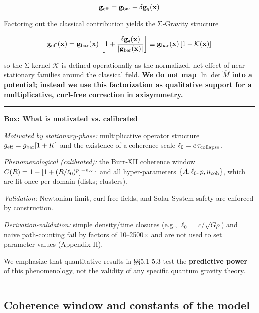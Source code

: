 \documentclass[11pt,a4paper]{article}
\begin{document}
\begin{equation}
\mathbf{g}_{\rm eff} = \mathbf{g}_{\rm bar} + \delta\mathbf{g}_q(\mathbf{x})
\end{equation}


Factoring out the classical contribution yields the Σ‑Gravity structure


\begin{equation}
\mathbf{g}_{\rm eff}(\mathbf{x}) = \mathbf{g}_{\rm bar}(\mathbf{x})\,\left[1 + \frac{\delta\mathbf{g}_q(\mathbf{x})}{\lvert\mathbf{g}_{\rm bar}(\mathbf{x})\rvert}\right] \equiv \mathbf{g}_{\rm bar}(\mathbf{x})\,[1+\mathcal{K}(\mathbf{x})]
\end{equation}


so the Σ‑kernel $\mathcal{K}$ is defined operationally as the normalized, net effect of near-stationary families around the classical field. \textbf{We do not map $\ln\det\hat{M}$ into a potential; instead we use this factorization as qualitative support for a multiplicative, curl-free correction in axisymmetry.}


\medskip\hrule\medskip


\textbf{Box: What is motivated vs. calibrated}


\textit{Motivated by stationary-phase:} multiplicative operator structure $g_{\rm eff}=g_{\rm bar}[1+K]$ and the existence of a coherence scale $\ell_0=c\,\tau_{\rm collapse}$. 


\textit{Phenomenological (calibrated):} the Burr-XII coherence window $C(R)=1-[1+(R/\ell_0)^p]^{-n_{\rm coh}}$ and all hyper-parameters $\{A,\ell_0,p,n_{\rm coh}\}$, which are fit once per domain (disks; clusters). 


\textit{Validation:} Newtonian limit, curl-free fields, and Solar-System safety are enforced by construction. 


\textit{Derivation-validation:} simple density/time closures (e.g., $\ell_0=c/\sqrt{G\rho}$) and naive path-counting fail by factors of 10–2500× and are not used to set parameter values (Appendix H).


We emphasize that quantitative results in §§5.1-5.3 test the \textbf{predictive power} of this phenomenology, not the validity of any specific quantum gravity theory.


\medskip\hrule\medskip


\subsection{Coherence window and constants of the model}
\end{document}
